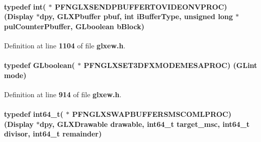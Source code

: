 \paragraph[{P\+F\+N\+G\+L\+X\+S\+E\+N\+D\+P\+B\+U\+F\+F\+E\+R\+T\+O\+V\+I\+D\+E\+O\+N\+V\+P\+R\+OC}]{\setlength{\rightskip}{0pt plus 5cm}typedef {\bf int}( $\ast$  P\+F\+N\+G\+L\+X\+S\+E\+N\+D\+P\+B\+U\+F\+F\+E\+R\+T\+O\+V\+I\+D\+E\+O\+N\+V\+P\+R\+OC) (Display $\ast$dpy, {\bf G\+L\+X\+Pbuffer} pbuf, {\bf int} {\bf i\+Buffer\+Type}, unsigned long $\ast${\bf pul\+Counter\+Pbuffer}, {\bf G\+Lboolean} {\bf b\+Block})}\label{glxew_8h_a0068300d087594e661aac5e50ba03a6d}


Definition at line {\bf 1104} of file {\bf glxew.\+h}.

\paragraph[{P\+F\+N\+G\+L\+X\+S\+E\+T3\+D\+F\+X\+M\+O\+D\+E\+M\+E\+S\+A\+P\+R\+OC}]{\setlength{\rightskip}{0pt plus 5cm}typedef {\bf G\+Lboolean}( $\ast$  P\+F\+N\+G\+L\+X\+S\+E\+T3\+D\+F\+X\+M\+O\+D\+E\+M\+E\+S\+A\+P\+R\+OC) ({\bf G\+Lint} {\bf mode})}\label{glxew_8h_a7777a2069882559004273eae69998fc1}


Definition at line {\bf 914} of file {\bf glxew.\+h}.

\paragraph[{P\+F\+N\+G\+L\+X\+S\+W\+A\+P\+B\+U\+F\+F\+E\+R\+S\+M\+S\+C\+O\+M\+L\+P\+R\+OC}]{\setlength{\rightskip}{0pt plus 5cm}typedef int64\+\_\+t( $\ast$  P\+F\+N\+G\+L\+X\+S\+W\+A\+P\+B\+U\+F\+F\+E\+R\+S\+M\+S\+C\+O\+M\+L\+P\+R\+OC) (Display $\ast$dpy, {\bf G\+L\+X\+Drawable} drawable, int64\+\_\+t {\bf target\+\_\+msc}, int64\+\_\+t {\bf divisor}, int64\+\_\+t {\bf remainder})}\label{glxew_8h_a058acb697fc842662c1fdaf296aa2537}


